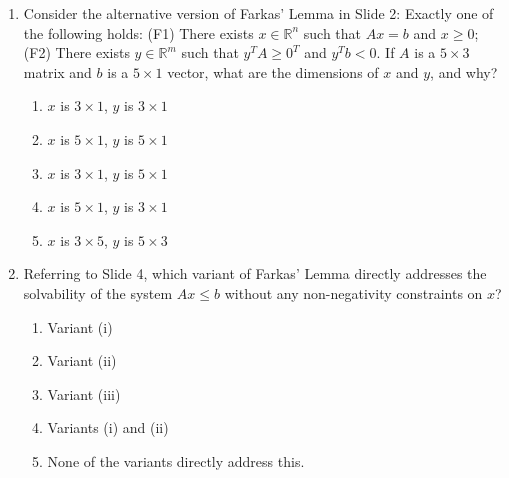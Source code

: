 \documentclass{article}%
\begin{document}
\begin{enumerate}
\begin{enumerate}
\begin{enumerate}%
\item $n \times 1$%
\item $m \times 1$%
\item $n \times m$%
\item $m \times n$%
\item The dimension of $y$ is not determined by the dimensions of $A$ and $b$.%
\end{enumerate}%
\vspace{0.5em}%
\item Consider the alternative version of Farkas' Lemma in Slide 2:  Exactly one of the following holds: (F1) There exists $x \in \mathbb{R}^n$ such that $Ax = b$ and $x \ge 0$; (F2) There exists $y \in \mathbb{R}^m$ such that $y^T A \ge 0^T$ and $y^T b < 0$. If $A$ is a $5 \times 3$ matrix and $b$ is a $5 \times 1$ vector, what are the dimensions of $x$ and $y$, and why?%
\begin{enumerate}%
\item $x$ is $3 \times 1$, $y$ is $3 \times 1$%
\item $x$ is $5 \times 1$, $y$ is $5 \times 1$%
\item $x$ is $3 \times 1$, $y$ is $5 \times 1$%
\item $x$ is $5 \times 1$, $y$ is $3 \times 1$%
\item $x$ is $3 \times 5$, $y$ is $5 \times 3$%
\end{enumerate}%
\vspace{0.5em}%
\item Referring to Slide 4, which variant of Farkas' Lemma directly addresses the solvability of the system $Ax \le b$ without any non-negativity constraints on $x$?%
\begin{enumerate}%
\item Variant (i)%
\item Variant (ii)%
\item Variant (iii)%
\item Variants (i) and (ii)%
\item None of the variants directly address this.%
\end{enumerate}%
\vspace{0.5em}%
\end{enumerate}%
\end{enumerate}

%
\newpage%
\end{document}
